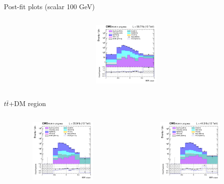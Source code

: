 \documentclass[8pt]{beamer}
\begin{document}
\begin{frame}{Post-fit plots (scalar 100 GeV)}
\begin{columns}
\begin{column}{0.33\textwidth}
\begin{center}
     			\includegraphics[width=1.0\textwidth, height=90pt]{figs/postfits/2018/log_cratio_ST_topCR_ll_BDT_tDM100_TTbar_BDT_output_scalar100_customBinsAttempt7.png}
    		\end{center}		
		\end{column}
\end{columns}

\vspace{-8pt}
\begin{columns}
\begin{column}{1.09\textwidth}
\begin{block}{\centering $t \bar t$+DM region}\end{block} \vspace{10pt}
\end{column}
\end{columns} \vspace{-16pt}
\begin{columns}
		\begin{column}{0.33\textwidth}
			\begin{center}
     			\includegraphics[width=1.0\textwidth, height=90pt]{figs/postfits/2016/log_cratio_TTbar_topCR_ll_BDT_ttDM100_TTbar_BDT_output_scalar100_customBinsAttempt7.png}
    		\end{center}		
		\end{column}
		\begin{column}{0.33\textwidth}
			\begin{center}
     			\includegraphics[width=1.0\textwidth, height=90pt]{figs/postfits/2017/log_cratio_TTbar_topCR_ll_BDT_ttDM100_TTbar_BDT_output_scalar100_customBinsAttempt7.png}

\end{center}
\end{column}
\end{columns}
\end{frame}
\end{document}
